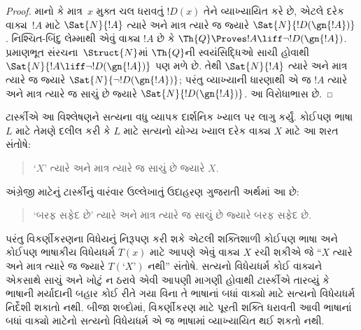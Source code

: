 \begin{proof}
માનો કે માત્ર~$x$ મુક્ત ચલ ધરાવતું $!D(x)$ તેને વ્યાખ્યાયિત કરે છે, એટલે દરેક વાક્ય~$!A$ માટે $\Sat{N}{!A}$ ત્યારે અને માત્ર ત્યારે જ જ્યારે $\Sat{N}{!D(\gn{!A})}$. નિશ્ચિત-બિંદુ લેમ્માથી એવું વાક્ય $!A$ છે કે $\Th{Q} \Proves !A \liff \lnot !D(\gn{!A})$. પ્રમાણભૂત સંરચના~$\Struct{N}$માં $\Th{Q}$ની સ્વયંસિદ્ધિઓ સાચી હોવાથી $\Sat{N}{!A \liff \lnot !D(\gn{!A})}$ પણ મળે છે. તેથી $\Sat{N}{!A}$ ત્યારે અને માત્ર ત્યારે જ જ્યારે $\Sat{N}{\lnot !D(\gn{!A})}$; પરંતુ વ્યાખ્યાની ધારણાથી એ જ $!A$ ત્યારે અને માત્ર ત્યારે જ સાચું છે જ્યારે $\Sat{N}{!D(\gn{!A})}$. આ વિરોધાભાસ છે.
\end{proof}

ટાર્સ્કીએ આ વિશ્લેષણને સત્યના વધુ વ્યાપક દાર્શનિક ખ્યાલ પર લાગુ કર્યું. કોઈપણ ભાષા $L$ માટે તેમણે દલીલ કરી કે $L$ માટે સત્યનો યોગ્ય ખ્યાલ દરેક વાક્ય $X$ માટે આ શરત સંતોષે:
\begin{quote}
`$X$' ત્યારે અને માત્ર ત્યારે જ સાચું છે જ્યારે $X$.
\end{quote}
અંગ્રેજી માટેનું ટાર્સ્કીનું વારંવાર ઉલ્લેખાતું ઉદાહરણ ગુજરાતી અર્થમાં આ છે:
\begin{quote}
`બરફ સફેદ છે' ત્યારે અને માત્ર ત્યારે જ સાચું છે જ્યારે બરફ સફેદ છે.
\end{quote}
પરંતુ વિકર્ણીકરણના વિધેયનું નિરૂપણ કરી શકે એટલી શક્તિશાળી કોઈપણ ભાષા અને કોઈપણ ભાષાકીય વિધેયધર્મ $T(x)$ માટે આપણે એવું વાક્ય $X$ રચી શકીએ જે ``$X$ ત્યારે અને માત્ર ત્યારે જ જ્યારે $T(\text{`$X$'})$ નથી'' સંતોષે. સત્યનો વિધેયધર્મ કોઈ વાક્યને એકસાથે સાચું અને ખોટું ન ઠરાવે એવી આપણી માગણી હોવાથી ટાર્સ્કીએ તારવ્યું કે ભાષાની મર્યાદાની બહાર કોઈ રીતે ગયા વિના તે ભાષાનાં બધાં વાક્યો માટે સત્યનો વિધેયધર્મ નિર્દેશી શકાતો નથી. બીજા શબ્દોમાં, વિકર્ણીકરણ માટે પૂરતી શક્તિ ધરાવતી આવી ભાષાનાં બધાં વાક્યો માટેનો સત્યનો વિધેયધર્મ એ જ ભાષામાં વ્યાખ્યાયિત થઈ શકતો નથી.
\endgroup


\OLEndChapterHook
\endgroup


\OLEndPartHook
